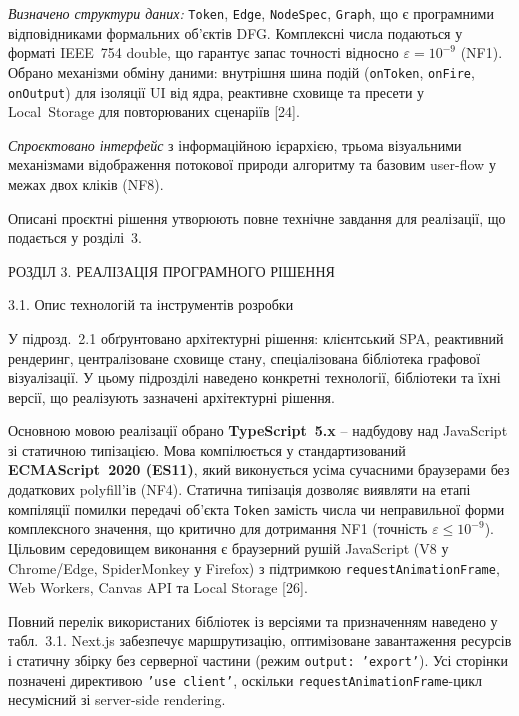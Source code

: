 \documentclass[
]{article}
\begin{document}
\emph{Визначено структури даних:} \texttt{Token}, \texttt{Edge},
\texttt{NodeSpec}, \texttt{Graph}, що є програмними відповідниками
формальних об'єктів DFG. Комплексні числа подаються у форматі IEEE~754
double, що гарантує запас точності відносно \(\varepsilon = 10^{- 9}\)
(NF1). Обрано механізми обміну даними: внутрішня шина подій
(\texttt{onToken}, \texttt{onFire}, \texttt{onOutput}) для ізоляції UI
від ядра, реактивне сховище та пресети у Local~Storage для повторюваних
сценаріїв {[}24{]}.

\emph{Спроєктовано інтерфейс} з інформаційною ієрархією, трьома
візуальними механізмами відображення потокової природи алгоритму та
базовим user-flow у межах двох кліків (NF8).

Описані проєктні рішення утворюють повне технічне завдання для
реалізації, що подається у розділі~3.

\protect{}\label{_Toc229681122}{}РОЗДІЛ 3. РЕАЛІЗАЦІЯ
ПРОГРАМНОГО РІШЕННЯ

\protect{}\label{_Toc229681123}{}3.1. Опис технологій та
інструментів розробки

У підрозд.~2.1 обґрунтовано архітектурні рішення: клієнтський SPA,
реактивний рендеринг, централізоване сховище стану, спеціалізована
бібліотека графової візуалізації. У цьому підрозділі наведено конкретні
технології, бібліотеки та їхні версії, що реалізують зазначені
архітектурні рішення.

Основною мовою реалізації обрано \textbf{TypeScript~5.x} -- надбудову
над JavaScript зі статичною типізацією. Мова компілюється у
стандартизований \textbf{ECMAScript~2020 (ES11)}, який виконується усіма
сучасними браузерами без додаткових polyfill'ів (NF4). Статична
типізація дозволяє виявляти на етапі компіляції помилки передачі об'єкта
\texttt{Token} замість числа чи неправильної форми комплексного
значення, що критично для дотримання NF1 (точність
\(\varepsilon \leq 10^{- 9}\)). Цільовим середовищем виконання є
браузерний рушій JavaScript (V8 у Chrome/Edge, SpiderMonkey у Firefox) з
підтримкою \texttt{requestAnimationFrame}, Web Workers, Canvas API та
Local Storage {[}26{]}.

Повний перелік використаних бібліотек із версіями та призначенням
наведено у табл.~3.1. Next.js забезпечує маршрутизацію, оптимізоване
завантаження ресурсів і статичну збірку без серверної частини (режим
\texttt{output}\texttt{:\ ’}\texttt{export}\texttt{’}). Усі сторінки
позначені директивою
\texttt{’}\texttt{use}\texttt{\ }\texttt{client}\texttt{’}, оскільки
\texttt{requestAnimationFrame}-цикл несумісний зі server-side rendering.
\end{document}
